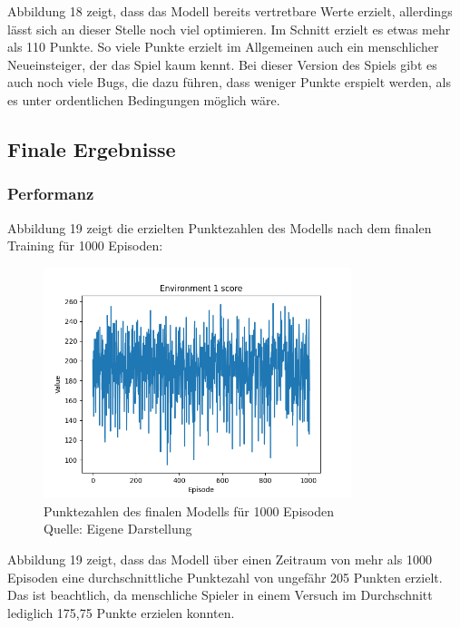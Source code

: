 Abbildung 18 zeigt, dass das Modell bereits vertretbare Werte erzielt, allerdings lässt sich an dieser Stelle noch viel optimieren. Im Schnitt erzielt es etwas mehr als 110 Punkte. So viele Punkte erzielt im Allgemeinen auch ein menschlicher Neueinsteiger, der das Spiel kaum kennt. Bei dieser Version des Spiels gibt es auch noch viele Bugs, die dazu führen, dass weniger Punkte erspielt werden, als es unter ordentlichen Bedingungen möglich wäre.
\subsection{Finale Ergebnisse}
\subsubsection{Performanz}
Abbildung 19 zeigt die erzielten Punktezahlen des Modells nach dem finalen Training für 1000 Episoden:
\nopagebreak
\begin{figure}[H]
	\centering
	\includegraphics[width=0.8\textwidth]{Bilder/maskableppo_ganzschoenclever_193avg_v3.1} 
	\caption[Punktezahlen des finalen Modells für 1000 Episoden]{Punktezahlen des finalen Modells für 1000 Episoden\\ Quelle: Eigene Darstellung}
\end{figure}

Abbildung 19 zeigt, dass das Modell über einen Zeitraum von mehr als 1000 Episoden eine durchschnittliche Punktezahl von ungefähr 205 Punkten erzielt. Das ist beachtlich, da menschliche Spieler in einem Versuch im Durchschnitt lediglich 175,75 Punkte erzielen konnten.\\

